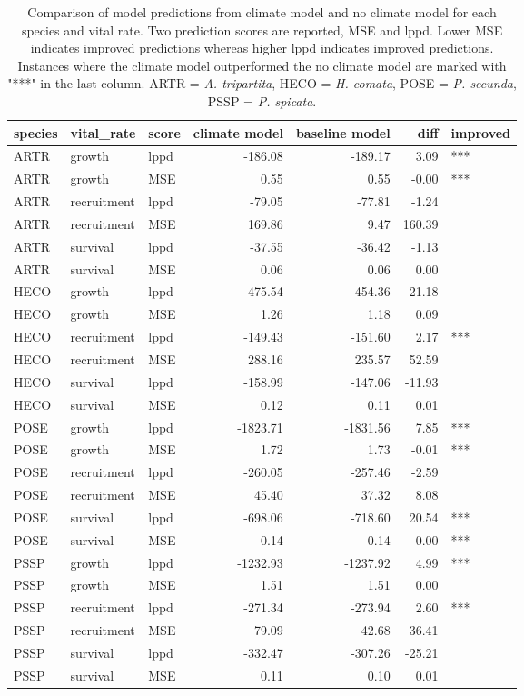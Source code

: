 \begin{table}[ht]
\centering
\caption{Comparison of model predictions from climate model and no climate model for each species and vital rate.  Two prediction scores are reported, MSE and lppd. Lower MSE indicates improved predictions whereas higher lppd indicates improved predictions.  Instances where the climate model outperformed the no climate model are marked with "***" in the last column. ARTR = \textit{A. tripartita}, HECO = \textit{H. comata}, POSE = \textit{P. secunda}, PSSP = \textit{P. spicata}.} 
\label{table:overallPreds}
\begin{tabular}{lllrrrl}
  \hline
species & vital\_rate & score & climate model & baseline model & diff & improved \\ 
  \hline
ARTR & growth & lppd & -186.08 & -189.17 & 3.09 & *** \\ 
  ARTR & growth & MSE & 0.55 & 0.55 & -0.00 & *** \\ 
  ARTR & recruitment & lppd & -79.05 & -77.81 & -1.24 &  \\ 
  ARTR & recruitment & MSE & 169.86 & 9.47 & 160.39 &  \\ 
  ARTR & survival & lppd & -37.55 & -36.42 & -1.13 &  \\ 
  ARTR & survival & MSE & 0.06 & 0.06 & 0.00 &  \\ 
  HECO & growth & lppd & -475.54 & -454.36 & -21.18 &  \\ 
  HECO & growth & MSE & 1.26 & 1.18 & 0.09 &  \\ 
  HECO & recruitment & lppd & -149.43 & -151.60 & 2.17 & *** \\ 
  HECO & recruitment & MSE & 288.16 & 235.57 & 52.59 &  \\ 
  HECO & survival & lppd & -158.99 & -147.06 & -11.93 &  \\ 
  HECO & survival & MSE & 0.12 & 0.11 & 0.01 &  \\ 
  POSE & growth & lppd & -1823.71 & -1831.56 & 7.85 & *** \\ 
  POSE & growth & MSE & 1.72 & 1.73 & -0.01 & *** \\ 
  POSE & recruitment & lppd & -260.05 & -257.46 & -2.59 &  \\ 
  POSE & recruitment & MSE & 45.40 & 37.32 & 8.08 &  \\ 
  POSE & survival & lppd & -698.06 & -718.60 & 20.54 & *** \\ 
  POSE & survival & MSE & 0.14 & 0.14 & -0.00 & *** \\ 
  PSSP & growth & lppd & -1232.93 & -1237.92 & 4.99 & *** \\ 
  PSSP & growth & MSE & 1.51 & 1.51 & 0.00 &  \\ 
  PSSP & recruitment & lppd & -271.34 & -273.94 & 2.60 & *** \\ 
  PSSP & recruitment & MSE & 79.09 & 42.68 & 36.41 &  \\ 
  PSSP & survival & lppd & -332.47 & -307.26 & -25.21 &  \\ 
  PSSP & survival & MSE & 0.11 & 0.10 & 0.01 &  \\ 
   \hline
\end{tabular}
\end{table}
